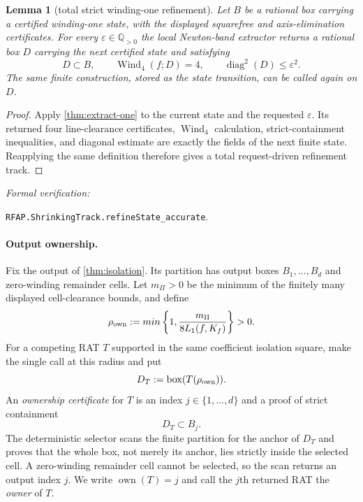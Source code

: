\documentclass[11pt]{article}
\newtheorem{lemma}[theorem]{Lemma}
\newcommand{\Q}{\mathbb{Q}}
\newcommand{\Wind}{\operatorname{Wind}}
\newcommand{\diamq}{\operatorname{diag}^{2}}
\newcommand{\eps}{\varepsilon}
\newcommand{\leanref}[1]{\par\smallskip\noindent
  \emph{Formal verification:}\par\nobreak
  {\raggedright\nolinkurl{#1}.\par}}
\begin{document}
\begin{lemma}[total strict winding-one refinement]
\label{lem:track-refinement}
Let $B$ be a rational box carrying a certified winding-one state, with the
displayed squarefree and axis-elimination certificates.  For every
$\eps\in\Q_{>0}$ the local
Newton-band extractor returns a rational box $D$ carrying the next certified
state and satisfying
\[
 D\subset B,\qquad \Wind_4(f;D)=4,
 \qquad \diamq(D)\le\eps^2.
\]
The same finite construction, stored as the state transition, can be called
again on $D$.
\end{lemma}

\begin{proof}
Apply \cref{thm:extract-one} to the current state and the requested
$\eps$.  Its returned four line-clearance certificates, $\Wind_4$
calculation, strict-containment inequalities, and diagonal estimate are
exactly the fields of the next finite state.  Reapplying the same definition
therefore gives a total request-driven refinement track.
\end{proof}

\leanref{RFAP.ShrinkingTrack.refineState_accurate}

\paragraph{Output ownership.}
Fix the output of \cref{thm:isolation}.  Its partition has output boxes
$B_1,\ldots,B_d$ and zero-winding remainder cells.  Let $m_{\Pi}>0$ be the
minimum of the finitely many displayed cell-clearance bounds, and define
\[
 \rho_{\rm own}:=min\left\{1,\frac{m_{\Pi}}{8L_1(f,K_f)}\right\}>0.
\]
For a competing RAT $T$ supported in the same coefficient isolation square,
make the single call at this radius and put
\[
                 D_T:=\operatorname{box}(T(\rho_{\rm own})).
\]
An \emph{ownership certificate} for $T$ is an index
$j\in\{1,\ldots,d\}$ and a proof of strict containment
\[
                              D_T\subset B_j.
\]
The deterministic selector scans the finite partition for the anchor of
$D_T$ and proves that the whole box, not merely its anchor, lies strictly
inside the selected cell.  A zero-winding remainder cell cannot be selected,
so the scan returns an output index $j$.  We write
$\operatorname{own}(T)=j$ and call the $j$th returned RAT the \emph{owner} of
$T$.
\end{document}
